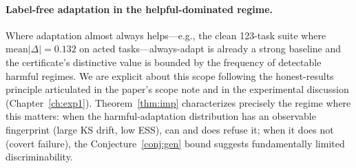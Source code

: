 \paragraph{Label-free adaptation in the helpful-dominated regime.}
Where adaptation almost always helps---e.g., the clean 123-task suite where
$\text{mean}|\Delta| = 0.132$ on acted tasks---always-adapt is already a strong
baseline and the certificate's distinctive value is bounded by the frequency of
detectable harmful regimes.  We are explicit about this scope following the
honest-results principle articulated in the paper's scope note and in the
experimental discussion (Chapter~\ref{ch:exp1}).
Theorem~\ref{thm:imp} characterizes precisely the regime where this matters:
when the harmful-adaptation distribution has an observable fingerprint (large KS
drift, low ESS), \KGA{} can and does refuse it; when it does not
(covert failure), the Conjecture~\ref{conj:gen} bound suggests fundamentally
limited discriminability.